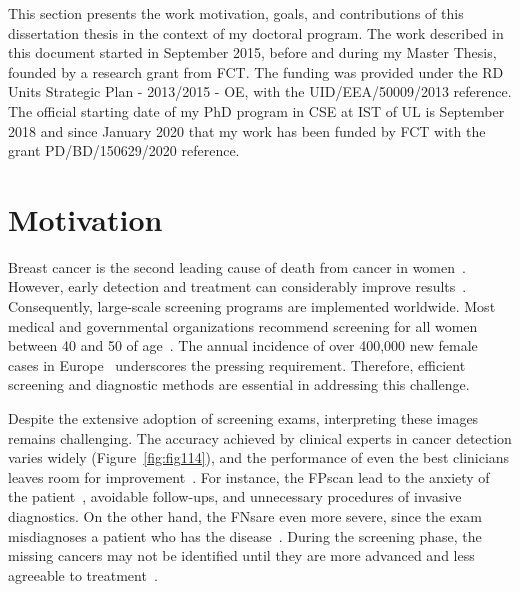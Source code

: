 \clearpage
\label{chap:chap001}
\noindent

This section presents the work motivation, goals, and contributions of this dissertation thesis in the context of my doctoral program.
The work described in this document started in September 2015, before and during my Master Thesis, founded by a research grant from \ac{FCT}.
The funding was provided under the \ac{RD} Units Strategic Plan - 2013/2015 - \ac{OE}, with the UID/EEA/50009/2013 reference.
The official starting date of my \ac{PhD} program in \ac{CSE} at \ac{IST} of \ac{UL} is September 2018 and since January 2020 that my work has been funded by \ac{FCT} with the grant PD/BD/150629/2020 reference.

\section{Motivation}
\label{sec:chap001001}

Breast cancer is the second leading cause of death from cancer in women~\cite{https://doi.org/10.3322/caac.21754}.
However, early detection and treatment can considerably improve results~\cite{doi:10.1002/cncr.32859}.
Consequently, large-scale screening programs are implemented worldwide.
Most medical and governmental organizations recommend screening for all women between 40 and 50 of age~\cite{https://doi.org/10.3322/caac.21754}.
The annual incidence of over 400,000 new female cases in Europe~\cite{Dafni2019} underscores the pressing requirement.
Therefore, efficient screening and diagnostic methods are essential in addressing this challenge.

Despite the extensive adoption of screening exams, interpreting these images remains challenging.
The accuracy achieved by clinical experts in cancer detection varies widely (Figure~\ref{fig:fig114}), and the performance of even the best clinicians leaves room for improvement~\cite{10.1001/jamainternmed.2015.5231}.
For instance, the \acp{FP}\footnotemark[1] can lead to the anxiety of the patient~\cite{10.1001/jamainternmed.2014.981}, avoidable follow-ups, and unnecessary procedures of invasive diagnostics.
On the other hand, the \acp{FN}\footnotemark[2] are even more severe, since the exam misdiagnoses a patient who has the disease~\cite{doi:10.1056/NEJMe1912943}.
During the screening phase, the missing cancers may not be identified until they are more advanced and less agreeable to treatment~\cite{Houssami2017}.

